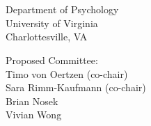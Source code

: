 
\begin{titlepage}

\begin{addmargin}[-1cm]{-3cm}
\begin{center}
\large

\hfill
\vfill

\begingroup
\color{Maroon}\spacedallcaps{\myTitle} \\ \bigskip %
\endgroup

\spacedlowsmallcaps{\myName} %

\vfill
\mySubtitle \\ \medskip %
Department of Psychology \\
University of Virginia \\
Charlottesville, VA \\

\vfill

Proposed Committee: \\
Timo von Oertzen (co-chair) \\
Sara Rimm-Kaufmann (co-chair) \\
Brian Nosek \\
Vivian Wong

\end{center}
\end{addmargin}

\end{titlepage}